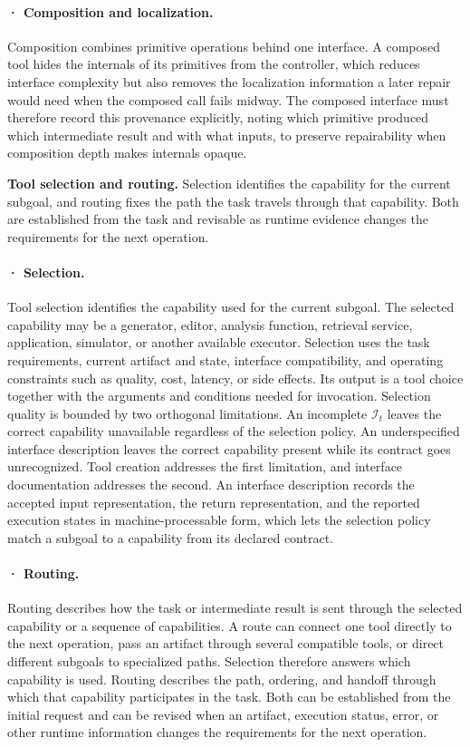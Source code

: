 \paragraph{· Composition and localization.} Composition combines primitive operations behind one interface. A composed tool hides the internals of its primitives from the controller, which reduces interface complexity but also removes the localization information a later repair would need when the composed call fails midway. The composed interface must therefore record this provenance explicitly, noting which primitive produced which intermediate result and with what inputs, to preserve repairability when composition depth makes internals opaque.

\textbf{Tool selection and routing.} Selection identifies the capability for the current subgoal, and routing fixes the path the task travels through that capability. Both are established from the task and revisable as runtime evidence changes the requirements for the next operation.

\paragraph{· Selection.} Tool selection identifies the capability used for the current subgoal. The selected capability may be a generator, editor, analysis function, retrieval service, application, simulator, or another available executor. Selection uses the task requirements, current artifact and state, interface compatibility, and operating constraints such as quality, cost, latency, or side effects. Its output is a tool choice together with the arguments and conditions needed for invocation. Selection quality is bounded by two orthogonal limitations. An incomplete $\mathcal{I}_t$ leaves the correct capability unavailable regardless of the selection policy. An underspecified interface description leaves the correct capability present while its contract goes unrecognized. Tool creation addresses the first limitation, and interface documentation addresses the second. An interface description records the accepted input representation, the return representation, and the reported execution states in machine-processable form, which lets the selection policy match a subgoal to a capability from its declared contract.

\paragraph{· Routing.} Routing describes how the task or intermediate result is sent through the selected capability or a sequence of capabilities. A route can connect one tool directly to the next operation, pass an artifact through several compatible tools, or direct different subgoals to specialized paths. Selection therefore answers which capability is used. Routing describes the path, ordering, and handoff through which that capability participates in the task. Both can be established from the initial request and can be revised when an artifact, execution status, error, or other runtime information changes the requirements for the next operation.

